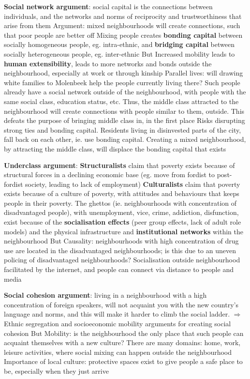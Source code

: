\documentclass{article}
\begin{document}
\begin{outline}
	\1 \textbf{Social network argument}: social capital is the connections between individuals, and the networks and norms of reciprocity and trustworthiness that arise from them
		\2 Argument: mixed neighbourhoods will create connections, such that poor people are better off
		\2 Mixing people creates \textbf{bonding capital} between socially homogeneous people, eg. intra-ethnic, and \textbf{bridging capital} between socially heterogeneous people, eg. inter-ethnic
		\2 But
			\3 Increased mobility leads to \textbf{human extensibility}, leads to more networks and bonds outside the neighbourhood, especially at work or through kinship
			\3 Parallel lives: will drawing white families to Molenbeek help the people currently living there? Such people already have a social network outside of the neighbourhood, with people with the same social class, education status, etc. Thus, the middle class attracted to the neighbourhood will create connections with people similar to them, outside. This defeats the purpose of bringing middle class in, in the first place
			\3 Risks disrupting strong ties and bonding capital. Residents living in disinvested parts of the city, fall back on each other, ie. use bonding capital. Creating a mixed neighbourhood, by attracting the middle class, will displace the bonding capital that exists
			
	\1 \textbf{Underclass argument}:
		\2 \textbf{Structuralists} claim that poverty exists because of structural forces in a declining economic base (eg. move from fordist to post-fordist society, leading to lack of employment)
		\2 \textbf{Culturalists} claim that poverty exists because of a culture of poverty, with attitudes and behaviours that keeps people in their poverty. The ghettos (ie. neighbourhoods with concentration of disadvantaged people), with unemployment, vice, crime, addiction, disfunction, exist because of the \textbf{socialisation effects} (peer group effects, lack of adult role models) and the physical infrastructure and \textbf{institutional networks} within the neighbourhood
		\2 But
			\3 Causality: neighbourhoods with high concentration of drug use are located in the disadvantaged neighbourhoods; is this due to an uneven policing of disadvantaged neighbourhoods?
			\3 Socialisation outside neighbourhood facilitated by the internet, and people can connect via distance to people and media
	
	\1 \textbf{Social cohesion argument}: living in a neighbourhood with a high concentration of foreign speakers, will not acquaint you with the new country's language and norms, and this will make it harder to climb the social ladder. $\Rightarrow$ Ethnic segregation and socioeconomic mobility arguments for creating social cohesion
		\2 But
			\3 Mobility: is the neighbourhood the only place that such people can acquaint themselves with a new culture? There are many domains: home, work, leisure activities, where social mixing can happen outside the neighbourhood
			\3 Importance of local culture: protective spaces exist to give people a safe place to be, especially when they just arrive


\end{outline}
\end{document}
